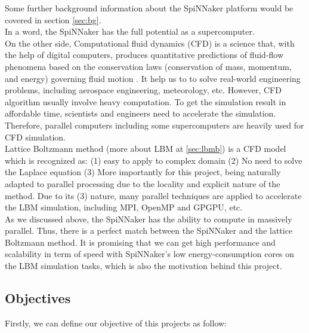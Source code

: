 Some further background information about the SpiNNaker platform would be covered in section \ref{sec:bg}. \\

In a word, the SpiNNaker has the full potential as a supercomputer. \\
 
On the other side, Computational fluid dynamics (CFD) is a science that, with the help of digital computers, produces quantitative predictions of fluid-flow phenomena based on the conservation laws (conservation of mass, momentum, and energy) governing fluid motion \cite{thelbmbible}. It help us to to solve real-world engineering problems, including aerospace engineering, meteorology, etc. However, CFD algorithm usually involve heavy computation. To get the simulation result in affordable time, scientists and engineers need to accelerate the simulation. Therefore, parallel computers including some supercomputers are heavily used for CFD simulation.\\

Lattice Boltzmann method (more about LBM at \ref{sec:lbmb}) is a CFD model which is recognized\cite{lbmmbook} as: (1) easy to apply to complex domain (2) No need to solve the Laplace equation (3) More importantly for this project, being naturally adapted to parallel processing due to the locality and explicit nature of the method. Due to its (3) nature, many parallel techniques are applied to accelerate the LBM simulation, including MPI\cite{he1999three}, OpenMP\cite{massaioli2002achieving} and GPGPU\cite{rogers1990upwind}, etc. \\

As we discussed above, the SpiNNaker has the ability to compute in massively parallel. Thus, there is a perfect match between the SpiNNaker and the lattice Boltzmann method. It is promising that we can get high performance and scalability in term of speed with SpiNNaker's low energy-consumption cores on the LBM simulation tasks, which is also the motivation behind this project.  \\




\subsection{Objectives} \label{sec:Obj}

Firstly, we can define our objective of this projects as follow:\\

